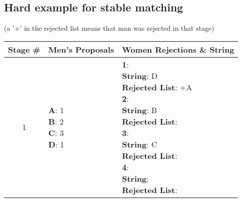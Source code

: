 \documentclass{article}
\begin{document}
\subsection{Hard example for stable matching}
\begin{center}
    (a '+' in the rejected list means that man was rejected in that stage)

    \begin{longtable}{ c|l|l }
        \textbf{Stage \#} & \textbf{Men's Proposals} & \textbf{Women Rejections \& String} \\
        \hline

        1 & \makecell{\textbf{A}: 1 \\ \textbf{B}: 2 \\ \textbf{C}: 3 \\ \textbf{D}: 1} &  
        \makecell{\textbf{1}:\\ \hspace{10mm} \textbf{String}: D \\ \hspace{10mm} \textbf{Rejected List}: +A \\
                    \textbf{2}:\\ \hspace{10mm} \textbf{String}: B \\ \hspace{10mm} \textbf{Rejected List}: \\
                    \textbf{3}:\\ \hspace{10mm} \textbf{String}: C \\ \hspace{10mm} \textbf{Rejected List}: \\
                    \textbf{4}:\\ \hspace{10mm} \textbf{String}:  \\ \hspace{10mm} \textbf{Rejected List}: \\} \\
        \hline 


\end{longtable}
\end{center}
\end{document}
